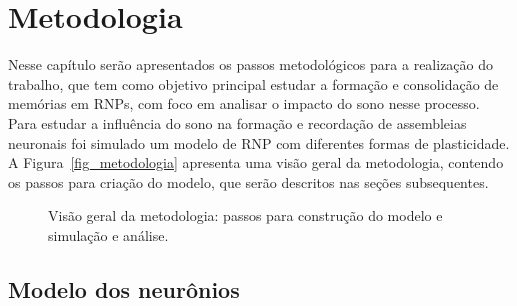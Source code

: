 \chapter{Metodologia}

Nesse capítulo serão apresentados os passos metodológicos para a realização do trabalho, que tem como objetivo principal estudar a
formação e consolidação de memórias em RNPs, com foco em analisar o impacto do sono nesse processo. Para estudar a influência do
sono na formação e recordação de assembleias neu\-ro\-nais foi simulado um modelo de RNP com diferentes formas de plasticidade. A
Figura~\ref{fig_metodologia} apresenta uma visão geral da metodologia, contendo os passos para criação do modelo, que serão
descritos nas seções subsequentes.

\begin{figure}[!ht]
\caption{Visão geral da metodologia: passos para construção do modelo e simulação e análise.}
\end{figure}


\section{Modelo dos neurônios}

